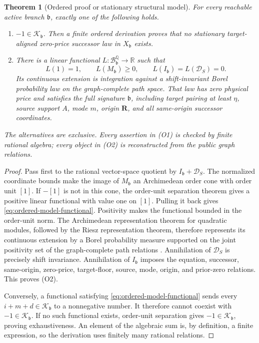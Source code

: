 \documentclass[11pt]{article}
\numberwithin{section}{part}
\theoremstyle{plain}
\newtheorem{theorem}{Theorem}[section]
\theoremstyle{definition}
\theoremstyle{remark}
\begin{document}
\begin{theorem}[Ordered proof or stationary structural model]
\label{thm:ordered-proof-or-model}
For every reachable active branch \(\mathfrak b\), exactly one of the following holds.
\begin{enumerate}[label=\textup{(O\arabic*)}]
\item \(-1\in\mathcal K_{\mathfrak b}\).  Then a finite ordered derivation proves
that no stationary target-aligned zero-price successor law in \(X_{\mathfrak b}\)
exists.
\item There is a linear functional
\(L:\mathcal B_{\mathfrak b}^{\mathbb Q}\to\mathbb R\) such that
\begin{equation}
 \label{eq:ordered-model-functional}
 L(1)=1,\qquad L(M_{\mathfrak b})\ge0,\qquad
 L(I_{\mathfrak b})=L(\mathcal D_S)=0.
\end{equation}
Its continuous extension is integration against a shift-invariant Borel
probability law on the graph-complete path space.  That law has zero physical
price and satisfies the full signature \(\mathfrak b\), including target
pairing at least \(\eta\), source support \(A\), mode \(m\), origin
\(\mathbf R\), and all same-origin successor coordinates.
\end{enumerate}
The alternatives are exclusive.  Every assertion in \textup{(O1)} is checked
by finite rational algebra; every object in \textup{(O2)} is reconstructed
from the public graph relations.
\end{theorem}

\begin{proof}
Pass first to the rational vector-space quotient by
\(I_{\mathfrak b}+\mathcal D_S\).  The normalized coordinate bounds make the image
of \(M_{\mathfrak b}\) an Archimedean order cone with order unit \([1]\).  If
\(-[1]\) is not in this cone, the order-unit separation theorem gives a
positive linear functional with value one on \([1]\).  Pulling it back gives
\eqref{eq:ordered-model-functional}.  Positivity makes the functional bounded
in the order-unit norm.  The Archimedean representation theorem for quadratic
modules, followed by the Riesz representation theorem, therefore represents
its continuous extension by a Borel probability measure supported on the
joint positivity set of the graph-complete path relations
\citep{Schmudgen2017}.  Annihilation of
\(\mathcal D_S\) is precisely shift invariance.  Annihilation of
\(I_{\mathfrak b}\) imposes the equation, successor, same-origin, zero-price,
target-floor, source, mode, origin, and prior-zero relations.  This proves
\textup{(O2)}.

Conversely, a functional satisfying \eqref{eq:ordered-model-functional} sends
every \(i+m+d\in\mathcal K_{\mathfrak b}\) to a nonnegative number.  It therefore
cannot coexist with \(-1\in\mathcal K_{\mathfrak b}\).  If no such functional
exists, order-unit separation gives \(-1\in\mathcal K_{\mathfrak b}\), proving
exhaustiveness.
An element of the algebraic sum is, by definition, a finite expression, so
the derivation uses finitely many rational relations.
\end{proof}
\end{document}
